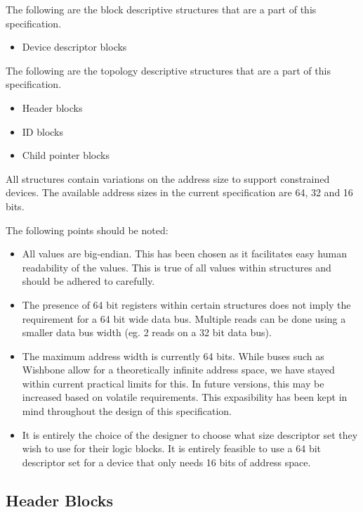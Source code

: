 \documentclass{article}
\begin{document}
The following are the block descriptive structures that are a part of this
specification.

\begin{itemize}
\item Device descriptor blocks
\end{itemize}

The following are the topology descriptive structures that are a part of this
specification.

\begin{itemize}
\item Header blocks
\item ID blocks
\item Child pointer blocks
\end{itemize}

All structures contain variations on the address size to support constrained
devices. The available address sizes in the current specification are 64, 32
and 16 bits.

The following points should be noted:

\begin{itemize}
\item All values are big-endian. This has been chosen as it facilitates easy
human readability of the values. This is true of all values within structures
and should be adhered to carefully.
\item The presence of 64 bit registers within certain structures does not imply
the requirement for a 64 bit wide data bus. Multiple reads can be done using a
smaller data bus width (eg. 2 reads on a 32 bit data bus).
\item The maximum address width is currently 64 bits. While buses such as Wishbone
allow for a theoretically infinite address space, we have stayed within current
practical limits for this. In future versions, this may be increased based on
volatile requirements. This expasibility has been kept in mind throughout the
design of this specification.
\item It is entirely the choice of the designer to choose what size descriptor set
they wish to use for their logic blocks. It is entirely feasible to use a 64 bit
descriptor set for a device that only needs 16 bits of address space.
\end{itemize}

\subsection{Header Blocks}
\end{document}
